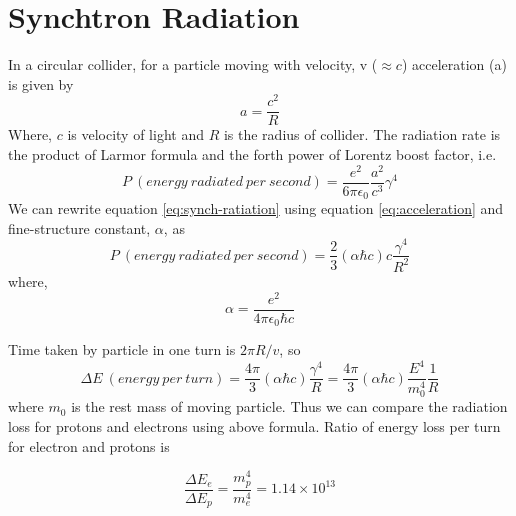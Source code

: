 \chapter{Synchtron Radiation} %
\label{cha:synchtron_radiation}
In a circular collider, for a particle moving with velocity, v ($\approx c$) acceleration (a) is given by
\begin{equation}\label{eq:acceleration}
	a = \frac{c^2}{R}
\end{equation}
Where, $c$ is velocity of light and $R$ is the radius of collider. The radiation rate is the product of Larmor formula and the forth power of Lorentz boost factor, i.e.
\begin{equation}\label{eq:synch-ratiation}
	P~(energy~radiated~per~second) = \frac{e^2}{6\pi \epsilon_0} \frac{a^2}{c^3} \gamma^4
\end{equation}
We can rewrite equation \ref{eq:synch-ratiation} using equation \ref{eq:acceleration} and fine-structure constant, $\alpha$, as
\begin{equation}
	P~(energy~radiated~per~second) = \frac{2}{3}(\alpha \hbar c) c \frac{\gamma^4}{R^2}
\end{equation}
where,
\begin{equation}\label{eq:fine-structure-constant}
	\alpha = \frac{e^2}{4 \pi \epsilon_0 \hbar c}
\end{equation}

Time taken by particle in one turn is $2\pi R/v$, so
\begin{equation}
	\Delta E~(energy~per~turn) = \frac{4\pi}{3}(\alpha \hbar c) \frac{\gamma^4}{R} = \frac{4\pi}{3}(\alpha \hbar c) \frac{E^4}{m^4_0}\frac{1}{R} 
\end{equation}
where $m_0$ is the rest mass of moving particle. Thus we can compare the radiation loss for protons and electrons using above formula. Ratio of energy loss per turn for electron and protons is

\begin{equation}
	\frac{\Delta E_e}{\Delta E_p} = \frac{m_p^4}{m_e^4} = 1.14 \times 10^{13}
\end{equation}

